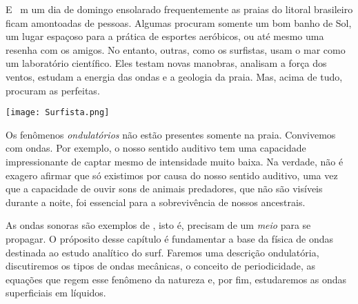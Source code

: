 \documentclass[book, 12pt, twoside, a5paper, english, brazil, sumario=tradicional, openany]{abntex2}
\begin{document}
\let\cleardoublepage\clearpage

\newpage

\pagestyle{fancy}
{}

\vspace{-3cm}
\lettrine{E}{} \ m um dia de domingo ensolarado frequentemente as praias do litoral brasileiro ficam amontoadas de pessoas. Algumas procuram somente um bom banho de Sol, um lugar espaçoso para a prática de esportes aeróbicos, ou até mesmo uma resenha com os amigos. No entanto, outras, como os surfistas, usam o mar como um laboratório científico. Eles testam novas manobras, analisam a força dos ventos, estudam a energia das ondas e a geologia da praia. Mas, acima de tudo, procuram as {\color{celestialblue}{ondas}} perfeitas. 

\vspace{-1.8cm}
\begin{center}
    \texttt{[image: Surfista.png]} 
\end{center}
\vspace{-2.55cm}

Os fenômenos \textit{ondulatórios} não estão presentes somente na praia. Convivemos com ondas. Por exemplo, o nosso sentido auditivo tem uma capacidade impressionante de captar {\color{celestialblue}{ondas sonoras}} mesmo de intensidade muito baixa. Na verdade, não é exagero afirmar que só existimos por causa do nosso sentido auditivo, uma vez que a capacidade de ouvir sons de animais predadores, que não são visíveis durante a noite, foi essencial para a sobrevivência de nossos ancestrais\nocite{1}.

As ondas sonoras são exemplos de {\color{celestialblue}{ondas mecânicas}}, isto é, precisam de um \textit{meio} para se propagar. O próposito desse capítulo é fundamentar a base da física de ondas destinada ao estudo analítico do surf. Faremos uma descrição ondulatória, discutiremos os tipos de ondas mecânicas, o conceito de periodicidade, as equações que regem esse fenômeno da natureza e, por fim, estudaremos as ondas superficiais em líquidos. 

\vspace{-0.9cm}

{}
\end{document}
